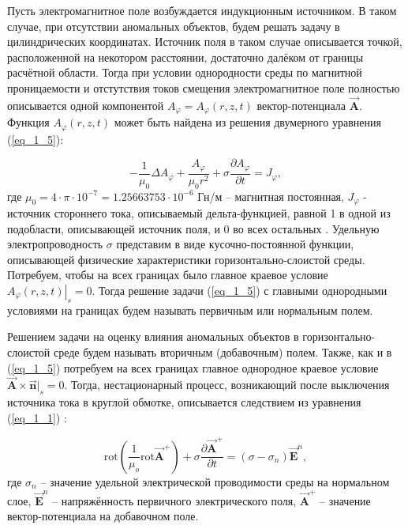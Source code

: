 Пусть электромагнитное поле возбуждается индукционным источником. В таком случае, при отсутствии аномальных объектов, будем решать задачу в цилиндрических координатах. Источник поля в таком случае описывается точкой, расположенной на некотором расстоянии, достаточно далёком от границы расчётной области. Тогда при условии однородности среды по магнитной проницаемости и отстутствия токов смещения электромагнитное поле полностью описывается одной компонентой $A_{\varphi} = A_{\varphi}(r, z, t)$ вектор-потенциала $\overrightarrow{\textbf{A}}$. Функция $A_{\varphi}(r, z, t)$ может быть найдена из решения двумерного уравнения (\ref{eq_1_5}):

\begin{equation} \label{eq_1_5}
	-\frac{1}{\mu_0} \Delta A_{\varphi} + \frac{A_{\varphi}}{\mu_0 r^2} + \sigma \frac{\partial A_{\varphi}}{\partial t} = J_{\varphi},
\end{equation}
где $\mu_0 = 4 \cdot \pi \cdot 10^{-7} = 1.25663753 \cdot 10^{-6}$ Гн/м -- магнитная постоянная, $J_{\varphi}$ - источник стороннего тока, описываемый дельта-функцией, равной 1 в одной из подобласти, описывающей источник поля, и 0 во всех остальных \cite{4}. Удельную электропроводность $\sigma$ представим в виде кусочно-постоянной функции, описывающей физические характеристики горизонтально-слоистой среды. Потребуем, чтобы на всех границах было главное краевое условие $\left.A_{\varphi}(r, z, t)\right|_s = 0$. Тогда решение задачи (\ref{eq_1_5}) с главными однородными условиями на границах будем называть первичным или нормальным полем.

Решением задачи на оценку влияния аномальных объектов в горизонтально-слоистой среде будем называть вторичным (добавочным) полем. Также, как и в (\ref{eq_1_5}) потребуем на всех границах главное однородное краевое условие $\overrightarrow{\textbf{A}} \times \overrightarrow{\textbf{n}} |_s = 0$. Тогда, нестационарный процесс, возникающий после выключения источника тока в круглой обмотке, описывается следствием из уравнения (\ref{eq_1_1}) \cite{5}:

\begin{equation} \label{eq_1_6}
	\text{rot} \left( \frac{1}{\mu_o} \text{rot} \overrightarrow{\textbf{A}}^{+} \right) + \sigma \frac{\partial \overrightarrow{\textbf{A}}^{+}}{\partial t} = (\sigma - \sigma_n) \overrightarrow{\textbf{E}}^n,
\end{equation}
где $\sigma_n$ -- значение удельной электрической проводимости среды на нормальном слое, $\overrightarrow{\textbf{E}}^n$ -- напряжённость первичного электрического поля, $\overrightarrow{\textbf{A}}^{+}$ -- значение вектор-потенциала на добавочном поле.

